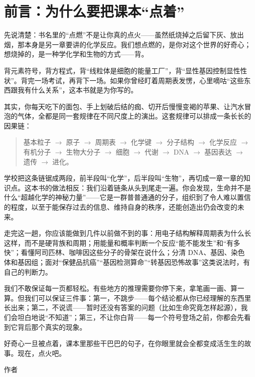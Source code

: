\chapter*{前言：为什么要把课本“点着”}

先说清楚：书名里的“点燃”不是让你真的点火——虽然纸烧掉之后留下灰、放出烟，那本身是另一章要讲的化学反应。我们想点燃的，是你对这个世界的好奇心；想烧掉的，是一种学化学和生物的方式——背。

背元素符号，背方程式，背“线粒体是细胞的能量工厂”，背“显性基因控制显性性状”。背完一场考试，再背下一场。如果你曾经盯着周期表发愣，心里嘀咕“这些东西跟我有什么关系”，这本书就是为你写的。

其实，你每天吃下的面包、手上划破后结的痂、切开后慢慢变褐的苹果、让汽水冒泡的气体，全都是同一套规律在不同尺度上的演出。这套规律可以排成一条长长的因果链：

\begin{quote}
基本粒子 \(\rightarrow\) 原子 \(\rightarrow\) 周期表 \(\rightarrow\) 化学键 \(\rightarrow\) 分子结构 \(\rightarrow\) 化学反应 \(\rightarrow\) 有机分子 \(\rightarrow\) 生物大分子 \(\rightarrow\) 细胞 \(\rightarrow\) 代谢 \(\rightarrow\) DNA \(\rightarrow\) 基因表达 \(\rightarrow\) 遗传 \(\rightarrow\) 进化。
\end{quote}

学校把这条链锯成两段，前半段叫“化学”，后半段叫“生物”，再切成一章一章的知识点。这本书的做法相反：我们沿着链条从头到尾走一遍。你会发现，生命并不是什么“超越化学的神秘力量”——它是一群普普通通的分子，组织到了令人难以置信的程度，以至于能保存过去的信息、维持自身的秩序，还能创造出仍会改变的未来。

走完这一趟，你应该能做到几件以前做不到的事：用电子结构解释周期表为什么长这样，而不是硬背族和周期；用能量和概率判断一个反应“能不能发生”和“有多快”；看懂阿司匹林、咖啡因这些分子的骨架在说什么；分清 DNA、基因、染色体和基因组；面对“保健品抗癌”“基因检测算命”“转基因恐怖故事”这类说法时，有自己的判断力。

我们不敢保证每一页都轻松。有些地方的推理需要你停下来，拿笔画一画、算一算。但我们可以保证三件事：第一，不跳步——每个结论都从你已经理解的东西里长出来；第二，不说谎——暂时还没有答案的问题（比如生命究竟怎样起源），我们会坦白地说“不知道”；第三，不让你白背——每一个符号登场之前，你都会先看到它背后那个真实的现象。

好奇心一旦被点着，课本里那些干巴巴的句子，在你眼里就会全都变成活生生的故事。现在，点火吧。

\hfill 作者
